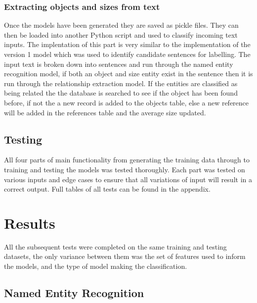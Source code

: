 \documentclass[11pt,oneside]{book}
\begin{document}
\subsection{Extracting objects and sizes from text}
Once the models have been generated they are saved as pickle files. They can then be loaded into another Python script and used to classify incoming text inputs. The implentation of this part is very similar to the implementation of the version 1 model which was used to identify candidate sentences for labelling. The input text is broken down into sentences and run through the named entity recognition model, if both an object and size entity exist in the sentence then it is run through the relationship extraction model. If the entities are classified as being related the the database is searched to see if the object has been found before, if not the a new record is added to the objects table, else a new reference will be added in the references table and the average size updated.


\section{Testing}

All four parts of main functionality from generating the training data through to training and testing the models was tested thoroughly. Each part was tested on various inputs and edge cases to ensure that all variations of input will result in a correct output. Full tables of all tests can be found in the appendix.

\chapter{Results}

All the subsequent tests were completed on the same training and testing datasets, the only variance between them was the set of features used to inform the models, and the type of model making the classification.

\section{Named Entity Recognition}
\end{document}
